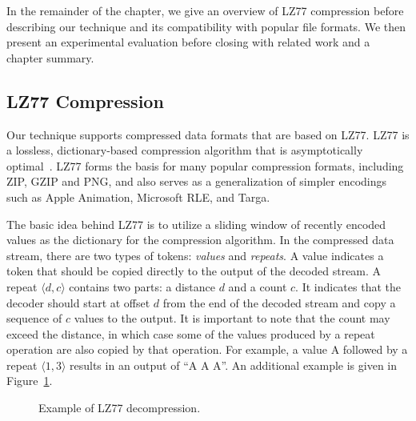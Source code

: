 In the remainder of the chapter, we give an overview of LZ77
compression before describing our technique and its compatibility with
popular file formats.  We then present an experimental evaluation
before closing with related work and a chapter summary.

\newcommand{\tupp}[2]{\langle#1, #2\rangle}

\newcommand{\pos}[0]{\mbox{\it pos}}

\newcommand{\tab}[0]{\mbox{~~~~}}


\subsection*{LZ77 Compression}

Our technique supports compressed data formats that are based on LZ77.
LZ77 is a lossless, dictionary-based compression algorithm that is
asymptotically optimal~\cite{wyner94optimal}.  LZ77 forms the basis
for many popular compression formats, including ZIP, GZIP and PNG, and
also serves as a generalization of simpler encodings such as Apple
Animation, Microsoft RLE, and Targa.

The basic idea behind LZ77 is to utilize a sliding window of recently
encoded values as the dictionary for the compression algorithm.  In
the compressed data stream, there are two types of tokens: {\it
  values} and {\it repeats}.  A value indicates a token that should be
copied directly to the output of the decoded stream.  A repeat
$\langle d, c \rangle$ contains two parts: a distance $d$ and a count
$c$.  It indicates that the decoder should start at offset $d$ from
the end of the decoded stream and copy a sequence of $c$ values to the
output.
It is important to note that the count may exceed the distance, in
which case some of the values produced by a repeat operation are also
copied by that operation.  For example, a value A followed by a repeat
$\tupp{1}{3}$ results in an output of ``A A A''.  An additional example
is given in Figure~\ref{fig:lz77}.

\begin{figure}[t!]
\centering
{}
\caption{Example of LZ77 decompression.
\protect\label{fig:lz77}}
\end{figure}

